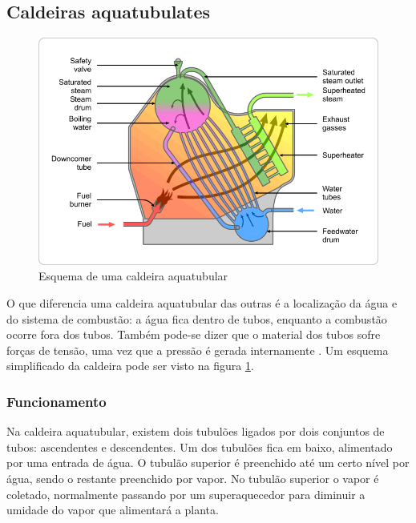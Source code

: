 %

\subsection{Caldeiras aquatubulates}

\begin{figure}[H]
\caption{\label{fig_circulo} Esquema de uma caldeira aquatubular}
\begin{center}
\includegraphics[scale=0.75]{img/caldeira.png}
\end{center}
\end{figure}

O que diferencia uma caldeira aquatubular das outras é a localização
da água e do sistema de combustão: a água fica dentro de tubos,
enquanto a combustão ocorre fora dos tubos. Também pode-se dizer que o
material dos tubos sofre forças de tensão, uma vez que a pressão é
gerada internamente \cite{boilers}. Um esquema simplificado da
caldeira pode ser visto na figura \ref{fig_circulo}.

\subsubsection{Funcionamento}
Na caldeira aquatubular, existem dois tubulões ligados por dois
conjuntos de tubos: ascendentes e descendentes. Um dos tubulões fica
em baixo, alimentado por uma entrada de água. O tubulão superior é
preenchido até um certo nível por água, sendo o restante preenchido
por vapor. No tubulão superior o vapor é coletado, normalmente
passando por um superaquecedor para diminuir a umidade do vapor que
alimentará a planta.

